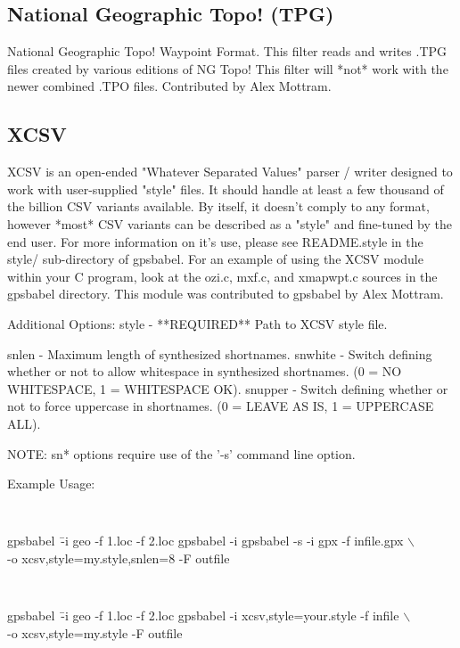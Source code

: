 \documentclass[12pt]{article}
\newcommand{\bsl}{$\backslash$}
\begin{document}
\subsection{National Geographic Topo! (TPG)}

	National Geographic Topo! Waypoint Format.  This filter 
	reads and writes .TPG files created by various editions of NG Topo! 
	This filter will *not* work with the newer combined .TPO files.  
	Contributed by Alex Mottram.



\subsection{XCSV}

XCSV is an open-ended "Whatever Separated Values" parser / writer
designed to work with user-supplied "style" files.  It should handle 
at least a few thousand of the billion CSV variants available.  
By itself, it doesn't comply to any format, however *most* CSV 
variants can be described as a "style" and fine-tuned by the end 
user.  For more information on it's use, please see README.style 
in the style/ sub-directory of gpsbabel.  For an example of using 
the XCSV module within your C program, look at the ozi.c, mxf.c, and
xmapwpt.c sources in the gpsbabel directory.  This module was 
contributed to gpsbabel by Alex Mottram.

Additional Options:
style	-	**REQUIRED** Path to XCSV style file.

snlen	-	Maximum length of synthesized shortnames. 
snwhite	-	Switch defining whether or not to allow whitespace
		in synthesized shortnames. 
		(0 = NO WHITESPACE, 1 = WHITESPACE OK).
snupper	-	Switch defining whether or not to force uppercase 
		in shortnames. (0 = LEAVE AS IS, 1 = UPPERCASE ALL).
	
NOTE:	sn* options require use of the '-s' command line option.

Example Usage:
{\tt \small
\begin{tabbing}
gpsbabel~\= -i geo -f 1.loc -f 2.loc \kill
gpsbabel \> -i gpsbabel -s -i gpx -f infile.gpx \bsl \+ \\
						-o xcsv,style=my.style,snlen=8 -F outfile
\end{tabbing}
}
{\tt \small
\begin{tabbing}
gpsbabel~\= -i geo -f 1.loc -f 2.loc \kill
gpsbabel \> -i xcsv,style=your.style -f infile \bsl \+ \\
						-o xcsv,style=my.style -F outfile
\end{tabbing}
}
\end{document}
